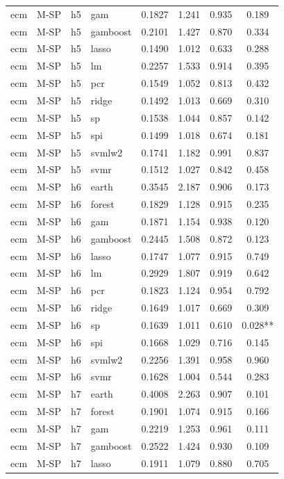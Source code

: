 \begin{ThreePartTable}
\begin{longtable}[t]{llclcccc}
ecm & M-SP & h5 & gam & 0.1827 & 1.241 & 0.935 & 0.189\\
ecm & M-SP & h5 & gamboost & 0.2101 & 1.427 & 0.870 & 0.334\\
ecm & M-SP & h5 & lasso & 0.1490 & 1.012 & 0.633 & 0.288\\
ecm & M-SP & h5 & lm & 0.2257 & 1.533 & 0.914 & 0.395\\
ecm & M-SP & h5 & pcr & 0.1549 & 1.052 & 0.813 & 0.432\\
ecm & M-SP & h5 & ridge & 0.1492 & 1.013 & 0.669 & 0.310\\
ecm & M-SP & h5 & sp & 0.1538 & 1.044 & 0.857 & 0.142\\
ecm & M-SP & h5 & spi & 0.1499 & 1.018 & 0.674 & 0.181\\
ecm & M-SP & h5 & svmlw2 & 0.1741 & 1.182 & 0.991 & 0.837\\
ecm & M-SP & h5 & svmr & 0.1512 & 1.027 & 0.842 & 0.458\\
\addlinespace
ecm & M-SP & h6 & earth & 0.3545 & 2.187 & 0.906 & 0.173\\
ecm & M-SP & h6 & forest & 0.1829 & 1.128 & 0.915 & 0.235\\
ecm & M-SP & h6 & gam & 0.1871 & 1.154 & 0.938 & 0.120\\
ecm & M-SP & h6 & gamboost & 0.2445 & 1.508 & 0.872 & 0.123\\
ecm & M-SP & h6 & lasso & 0.1747 & 1.077 & 0.915 & 0.749\\
ecm & M-SP & h6 & lm & 0.2929 & 1.807 & 0.919 & 0.642\\
ecm & M-SP & h6 & pcr & 0.1823 & 1.124 & 0.954 & 0.792\\
ecm & M-SP & h6 & ridge & 0.1649 & 1.017 & 0.669 & 0.309\\
ecm & M-SP & h6 & sp & 0.1639 & 1.011 & 0.610 & 0.028**\\
ecm & M-SP & h6 & spi & 0.1668 & 1.029 & 0.716 & 0.145\\
ecm & M-SP & h6 & svmlw2 & 0.2256 & 1.391 & 0.958 & 0.960\\
ecm & M-SP & h6 & svmr & 0.1628 & 1.004 & 0.544 & 0.283\\
\addlinespace
ecm & M-SP & h7 & earth & 0.4008 & 2.263 & 0.907 & 0.101\\
ecm & M-SP & h7 & forest & 0.1901 & 1.074 & 0.915 & 0.166\\
ecm & M-SP & h7 & gam & 0.2219 & 1.253 & 0.961 & 0.111\\
ecm & M-SP & h7 & gamboost & 0.2522 & 1.424 & 0.930 & 0.109\\
ecm & M-SP & h7 & lasso & 0.1911 & 1.079 & 0.880 & 0.705\\

\end{longtable}
\end{ThreePartTable}
